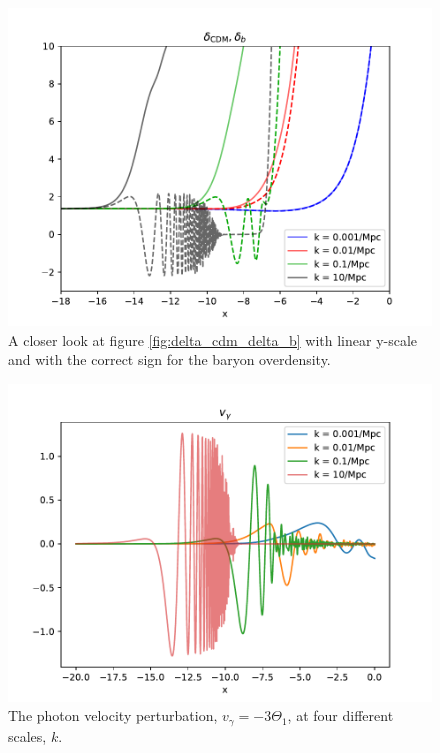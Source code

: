 \documentclass{aa}
\begin{document}
\begin{figure}[h!]
   \includegraphics[scale=0.65]{../figures/milestone3/delta_cdm_delta_b_zoom.pdf}
   \caption{A closer look at figure \ref{fig:delta_cdm_delta_b} with linear y-scale and with the correct sign for the baryon overdensity.}\label{fig:delta_cdm_delta_b_zoom}
\end{figure}

\begin{figure}[h!]
   \includegraphics[scale=0.6]{../figures/milestone3/v_gamma.pdf}
   \caption{The photon velocity perturbation, $v_\gamma=-3\Theta_1$, at four different scales, $k$.}\label{fig:v_gamma}
\end{figure}
\end{document}
